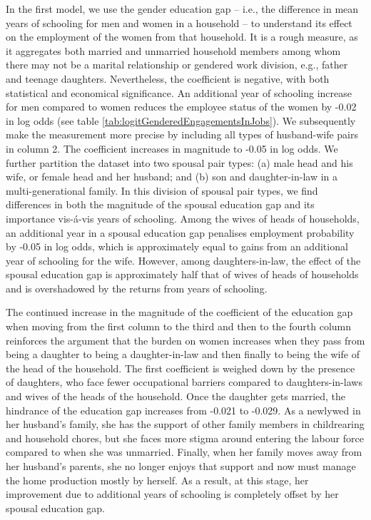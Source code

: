  

In the first model, we use the gender education gap -- i.e., the difference in mean years of schooling for men and women in a household -- to understand its effect on the employment of the women from that household. It is a rough measure, as it aggregates both married and unmarried household members among whom there may not be a marital relationship or gendered work division, e.g., father and teenage daughters. Nevertheless, the coefficient is negative, with both statistical and economical significance. An additional year of schooling increase for men compared to women reduces the employee status of the women by -0.02 in log odds (see table \ref{tab:logitGenderedEngagementsInJobs}). We subsequently make the measurement more precise by including all types of husband-wife pairs in column 2. The coefficient increases in magnitude to -0.05 in log odds. We further partition the dataset into two spousal pair types: (a) male head and his wife, or female head and her husband; and (b) son and daughter-in-law in a multi-generational family. In this division of spousal pair types, we find differences in both the magnitude of the spousal education gap and its importance vis-\'{a}-vis years of schooling. Among the wives of heads of households, an additional year in a spousal education gap penalises employment probability by -0.05 in log odds, which is approximately equal to gains from an additional year of schooling for the wife. However, among daughters-in-law, the effect of the spousal education gap is approximately half that of wives of heads of households and is overshadowed by the returns from years of schooling.\par

The continued increase in the magnitude of the coefficient of the education gap when moving from the first column to the third and then to the fourth column reinforces the argument that the burden on women increases when they pass from being a daughter to being a daughter-in-law and then finally to being the wife of the head of the household. The first coefficient is weighed down by the presence of daughters, who face fewer occupational barriers compared to daughters-in-laws and wives of the heads of the household. Once the daughter gets married, the hindrance of the education gap increases from -0.021 to -0.029. As a newlywed in her husband’s family, she has the support of other family members in childrearing and household chores, but she faces more stigma around entering the labour force compared to when she was unmarried. Finally, when her family moves away from her husband’s parents, she no longer enjoys that support and now must manage the home production mostly by herself. As a result, at this stage, her improvement due to additional years of schooling is completely offset by her spousal education gap.\par

